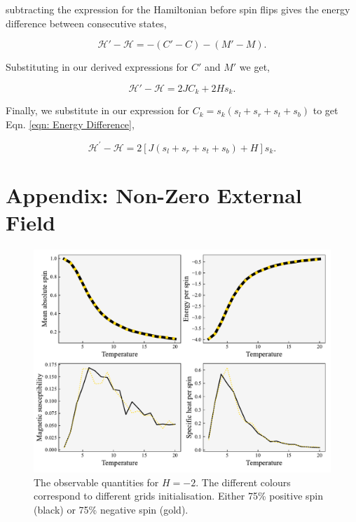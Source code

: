 \documentclass{IAYCPro}
\begin{document}
subtracting the expression for the Hamiltonian before spin flips gives the energy difference between consecutive states,

\begin{equation}
    \mathcal{H}' - \mathcal{H} = -(C'- C) - (M'-M).
\end{equation}

Substituting in our derived expressions for $C'$ and $M'$ we get,

\begin{equation}
    \mathcal{H}' - \mathcal{H} = 2JC_k +2Hs_k.
\end{equation}

Finally, we substitute in our expression for $C_k = s_k (s_{l} + s_{r} + s_{t} + s_{b})$ to get Eqn. \ref{eqn: Energy Difference},

\begin{equation}
    \mathcal{H}^{\prime}-\mathcal{H}=2\left[ J \left(s_l+s_r+s_t+s_b\right)+ H\right]s_k.
\end{equation}

\raggedbottom
\newpage

\section{Appendix: Non-Zero External Field}
\label{sec: All In One}

\begin{figure}[H]
    \centering
    \includegraphics[width=1\textwidth]{figs/nonzeroHall.pdf}
    \caption{The observable quantities for $H=-2$. The different colours correspond to different grids initialisation. Either 75\% positive spin (black) or 75\% negative spin (gold).}
    \label{fig:enter-label}
\end{figure}
\end{document}
